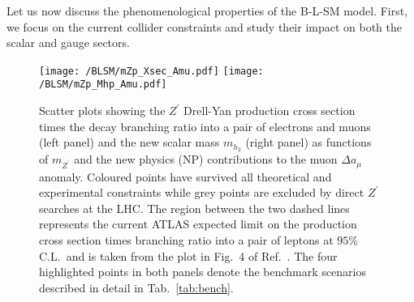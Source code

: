 %
%
Let us now discuss the phenomenological properties of the B-L-SM model. First, we focus on the current collider constraints and study their impact on both the scalar and gauge sectors.
\begin{figure}[H]
	\centering
	\texttt{[image: /BLSM/mZp\_Xsec\_Amu.pdf]}
	\texttt{[image: /BLSM/mZp\_Mhp\_Amu.pdf]}
	\caption{Scatter plots showing the $Z^\prime$ Drell-Yan production cross section times the decay branching ratio into a pair of electrons and muons (left panel) and the new scalar mass $m_{h_2}$ (right panel) as functions of $m_{Z^\prime}$ and the new physics (NP) contributions to the muon $\Delta a_\mu$ anomaly. Coloured points have survived all theoretical and experimental constraints while grey points are excluded by direct $Z^\prime$ searches at the LHC. The region between the two dashed lines represents the current ATLAS expected limit on the production cross section times branching ratio into a pair of leptons at $95\%$ C.L.~and is taken from the plot in Fig.~4 of Ref.~\cite{Aaboud:2017buh}. The four highlighted points in both panels denote the benchmark scenarios described in detail in Tab.~\ref{tab:bench}.}
	\label{fig:Plots1}
\end{figure}	

